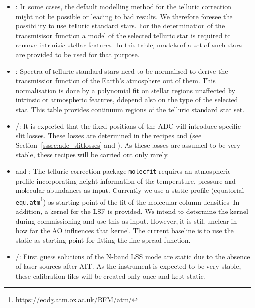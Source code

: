 \begin{itemize}
    \item \hyperref[dataitem:tss_model_cat]{}: In some cases, the default modelling method for the telluric correction might not be possible or leading to bad results. We therefore foresee the possibility to use telluric standard stars. For the determination of the transmisison function a model of the selected telluric star is required to remove intrinisic stellar features. In this table, models of a set of such stars are provided to be used for that purpose.
    \item \hyperref[dataitem:tss_cont_tab]{}: Spectra of telluric standard stars need to be normalised to derive the transmission function of the Earth's atmosphere out of them. This normalisation is done by a polynomial fit on stellar regions unaffected by intrinsic or atmospheric features, ddepend also on the type of the selected star. This table provides continuum regions of the telluric standard star set.
    \item \hyperref[dataitem:lm_adc_slitloss]{}/\hyperref[dataitem:n_adc_slitloss]{}: It is expected that the fixed positions of the \ac{ADC} will introduce specific slit losses. These losses are determined in the recipes \hyperref[rec:metislmadcmslitloss]{} and \hyperref[rec:metisnadcmslitloss]{} (see Section~\ref{sssec:adc_slitlosses} and \cite{METIS-calibration_plan}). As these losses are assumed to be very stable, these recipes will be carried out only rarely.
    \item \hyperref[dataitem:atm_profile]{} and \hyperref[dataitem:lsf_kernel]{}: The telluric correction package \texttt{molecfit} requires an atmospheric profile incorporating height information of the temperature, pressure and molecular abundances as input. Currently we use a static profile (equatorial \texttt{equ.atm}\footnote{\url{https://eodg.atm.ox.ac.uk/RFM/atm/}}) as starting point of the fit of the molecular column densities. In addition, a kernel for the \ac{LSF} is provided. We intend to determine the kernel during commissioning and use this as input. However, it is still unclear in how far the \ac{AO} influences that kernel. The current baseline is to use the static \hyperref[dataitem:lsf_kernel]{} as starting point for fitting the line spread function.
    \item \hyperref[dataitem:n_lss_dist_sol]{}/\hyperref[dataitem:n_lss_wave_guess]{}: First guess solutions of the N-band LSS mode are static due to the absence of laser sources after \ac{AIT}. As the instrument is expected to be very stable, these calibration files will be created only once and kept static.
\end{itemize}
